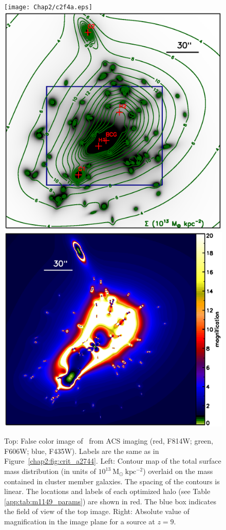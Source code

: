 \begin{figure}[h]
\centering
\texttt{[image: Chap2/c2f4a.eps]} \\
\includegraphics[height=0.28\textheight]{Chap2/c2f4b.eps}
\includegraphics[height=0.28\textheight]{Chap2/c2f4c.eps}
\caption[\MACSeleven\ image constraints and critical curves]{Top: False color image of \MACSeleven\ from ACS imaging (red, F814W; green, F606W; blue, F435W). Labels are the same as in Figure~\ref{chap2:fig:crit_a2744}. Left: Contour map of the total surface mass distribution (in units of $10^{13}\ \mathrm{M_\odot \ kpc^{-2}}$) overlaid on the mass contained in cluster member galaxies. The spacing of the contours is linear. The locations and labels of each optimized halo (see Table \ref{app:tab:m1149_params}) are shown in red. The blue box indicates the field of view of the top image. Right: Absolute value of magnification in the image plane for a source at $z=9$.}
\label{chap2:fig:crit_m1149}
\end{figure}

